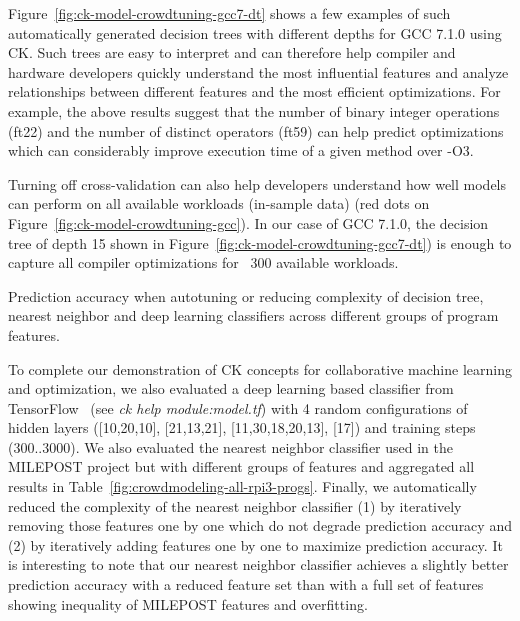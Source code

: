 Figure~\ref{fig:ck-model-crowdtuning-gcc7-dt} shows a few examples of such automatically
generated decision trees with different depths for GCC 7.1.0 using CK.
%
Such trees are easy to interpret and can therefore help compiler and hardware 
developers quickly understand the most influential features and analyze
relationships between different features and the most efficient
optimizations.
%
For example, the above results suggest that the number of binary integer operations (ft22) 
and the number of distinct operators (ft59) can help predict optimizations 
which can considerably improve execution time of a given method over -O3.

Turning off cross-validation can also help developers understand 
how well models can perform on all available workloads (in-sample data)
(red dots on Figure~\ref{fig:ck-model-crowdtuning-gcc}).
%
In our case of GCC 7.1.0, the decision tree of depth 15 shown in Figure~\ref{fig:ck-model-crowdtuning-gcc7-dt})
is enough to capture all compiler optimizations for ~300 available workloads.

  \begin{table}[!htbp]
    \centering
    {\small
    }
    \caption{
     Prediction accuracy when autotuning or reducing complexity of decision tree, 
     nearest neighbor and deep learning classifiers
     across different groups of program features.
    }
    \label{fig:crowdmodeling-all-rpi3-progs}
  \end{table}

To complete our demonstration of CK concepts for collaborative machine learning and optimization,
we also evaluated a deep learning based classifier from TensorFlow~\cite{DBLP:journals/corr/AbadiABBCCCDDDG16}
(see \emph{ck help module:model.tf})
with 4 random configurations of hidden layers ([10,20,10], [21,13,21], [11,30,18,20,13], [17]) 
and training steps (300..3000).
%
We also evaluated the nearest neighbor classifier used in the MILEPOST project but with different groups of features 
and aggregated all results in Table~\ref{fig:crowdmodeling-all-rpi3-progs}. 
%
Finally, we automatically reduced the complexity of the nearest neighbor classifier (1) by iteratively removing those features one by one
which do not degrade prediction accuracy and (2) by iteratively adding features one by one to maximize prediction accuracy.
%
It is interesting to note that our nearest neighbor classifier achieves
a slightly better prediction accuracy with a reduced feature set than with 
a full set of features showing inequality of MILEPOST features
and overfitting.

